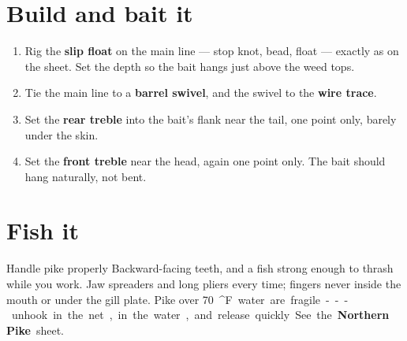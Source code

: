 \section{Build and bait it}
\begin{enumerate}
\item Rig the \textbf{slip float} on the main line --- stop knot, bead, float --- exactly as on the  sheet. Set the depth so the bait hangs just above the weed tops.
\item Tie the main line to a \textbf{barrel swivel}, and the swivel to the \textbf{wire trace}.
\item Set the \textbf{rear treble} into the bait's flank near the tail, one point only, barely under the skin.
\item Set the \textbf{front treble} near the head, again one point only. The bait should hang naturally, not bent.
\end{enumerate}

\section{Fish it}
\begin{telosfacts}[0.20]
\end{telosfacts}

\begin{teloshazard}{Handle pike properly}
Backward-facing teeth, and a fish strong enough to thrash while you work. Jaw spreaders and long pliers every time; fingers never inside the mouth or under the gill plate. Pike over \qty{70}{^\circ F} water are fragile --- unhook in the net, in the water, and release quickly. See the \textbf{Northern Pike} sheet.
\end{teloshazard}

